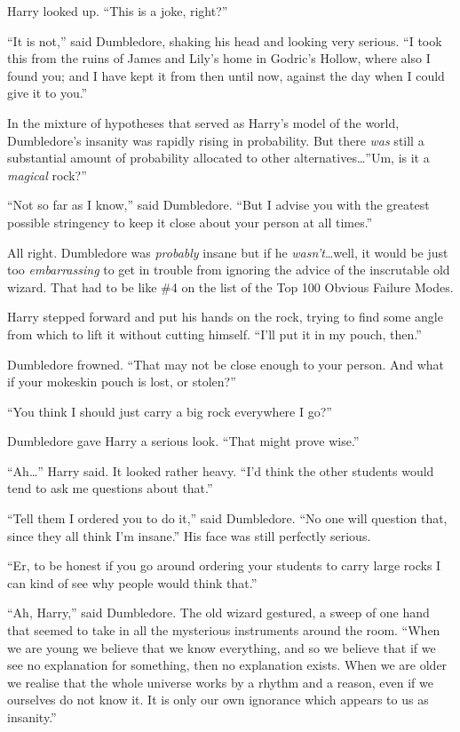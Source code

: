 Harry looked up. “This is a joke, right?”

“It is not,” said Dumbledore, shaking his head and looking very serious. “I took this from the ruins of James and Lily’s home in Godric’s Hollow, where also I found you; and I have kept it from then until now, against the day when I could give it to you.”

In the mixture of hypotheses that served as Harry’s model of the world, Dumbledore’s insanity was rapidly rising in probability. But there \emph{was} still a substantial amount of probability allocated to other alternatives…”Um, is it a \emph{magical} rock?”

“Not so far as I know,” said Dumbledore. “But I advise you with the greatest possible stringency to keep it close about your person at all times.”

All right. Dumbledore was \emph{probably} insane but if he
\emph{wasn’t}…well, it would be just too \emph{embarrassing} to get in trouble from ignoring the advice of the inscrutable old wizard. That had to be like \#4 on the list of the Top 100 Obvious Failure Modes.

Harry stepped forward and put his hands on the rock, trying to find some angle from which to lift it without cutting himself. “I’ll put it in my pouch, then.”

Dumbledore frowned. “That may not be close enough to your person. And what if your mokeskin pouch is lost, or stolen?”

“You think I should just carry a big rock everywhere I go?”

Dumbledore gave Harry a serious look. “That might prove wise.”

“Ah…” Harry said. It looked rather heavy. “I’d think the other students would tend to ask me questions about that.”

“Tell them I ordered you to do it,” said Dumbledore. “No one will question that, since they all think I’m insane.” His face was still perfectly serious.

“Er, to be honest if you go around ordering your students to carry large rocks I can kind of see why people would think that.”

“Ah, Harry,” said Dumbledore. The old wizard gestured, a sweep of one hand that seemed to take in all the mysterious instruments around the room. “When we are young we believe that we know everything, and so we believe that if we see no explanation for something, then no explanation exists. When we are older we realise that the whole universe works by a rhythm and a reason, even if we ourselves do not know it. It is only our own ignorance which appears to us as insanity.”

